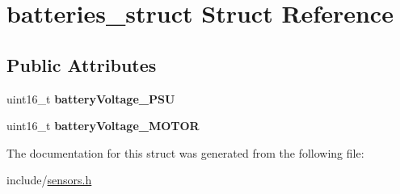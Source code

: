 \hypertarget{structbatteries__struct}{\section{batteries\-\_\-struct Struct Reference}
\label{structbatteries__struct}
}
\subsection*{Public Attributes}
\begin{DoxyCompactItemize}
\item 
\hypertarget{structbatteries__struct_a7fa060f31ea824ef5f332257cae63648}{uint16\-\_\-t {\bfseries battery\-Voltage\-\_\-\-P\-S\-U}}\label{structbatteries__struct_a7fa060f31ea824ef5f332257cae63648}

\item 
\hypertarget{structbatteries__struct_aa000903a4f11f58ff947c4e065a3acb8}{uint16\-\_\-t {\bfseries battery\-Voltage\-\_\-\-M\-O\-T\-O\-R}}\label{structbatteries__struct_aa000903a4f11f58ff947c4e065a3acb8}

\end{DoxyCompactItemize}


The documentation for this struct was generated from the following file\-:\begin{DoxyCompactItemize}
\item 
include/\hyperlink{sensors_8h}{sensors.\-h}\end{DoxyCompactItemize}
